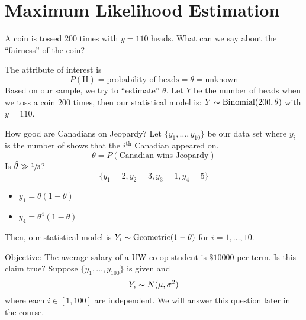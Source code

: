 \section{Maximum Likelihood Estimation}

\begin{exbox}
    \begin{example}
        A coin is tossed $ 200 $ times with $ y=110 $ heads. What can we say
        about the ``fairness'' of the coin?
        
        The attribute of interest is
        \[ P(\text{H})=\text{probability of heads}=\theta=\text{unknown} \]
        Based on our sample, we try to ``estimate'' $ \theta $.
        Let $ Y $ be the number of heads when we toss a coin $ 200 $ times,
        then our statistical model is: $ Y \thicksim \operatorname{Binomial}(200,\theta) $
        with $ y=110 $.
    \end{example}
\end{exbox}

\begin{exbox}
    \begin{example}
        How good are Canadians on Jeopardy? Let $ \{y_1,\ldots ,y_{10}\} $
        be our data set where $ y_i $ is the number of shows that the
        $ i^{\text{th}} $ Canadian appeared on.
        \[ \theta=P(\text{Canadian wins Jeopardy}) \]
        Is $ \hat{\theta}\gg\sfrac{1}{3} $?
        \[ \{y_1=2,y_2=3,y_3=1,y_4=5\} \]
        \begin{itemize}
            \item $ y_1=\theta(1-\theta) $
            \item $ y_4=\theta^4(1-\theta) $
        \end{itemize}
        Then, our statistical model is $ Y_i \thicksim \operatorname{Geometric}(1-\theta) $
        for $ i=1,\ldots ,10 $.
    \end{example}
\end{exbox}
\underline{Objective}: The average salary of a UW co-op student is $ \$10000 $ per term.
Is this claim true? Suppose $ \{y_1,\ldots ,y_{100}\} $ is given and
\[ Y_i \thicksim N(\mu,\sigma^2) \]
where each $ i\in[1,100] $ are independent. We will answer this question later in the course.

